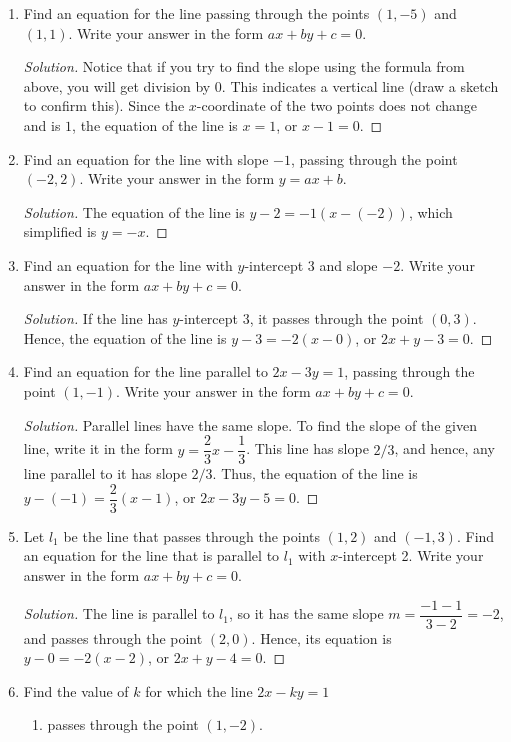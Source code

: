 \documentclass[12pt]{article}
\newenvironment{solution}{\begin{proof}[Solution]}{\end{proof}}
\begin{document}
\begin{enumerate}
		\begin{solution}
			The equation of a nonvertical line passing through two points $(x_1,y_1)$ and $(x_2,y_2)$ is $y-y_1=m(x-x_1)$, where the slope $m=\dfrac{y_2-y_1}{x_2-x_1}$. Note that it does not matter which point is first and which is second - they form the same line. For the given line, the slope is $m=\dfrac{2-0}{1-(-1)}=1$, so the equation of the line is $y-2=1(x-1)$, or $y=x+1$.
		\end{solution}
		\item Find an equation for the line passing through the points $(1,-5)$ and $(1,1)$. Write your answer in the form $ax+by+c=0$.
		\begin{solution}
			Notice that if you try to find the slope using the formula from above, you will get division by $0$. This indicates a vertical line (draw a sketch to confirm this). Since the $x$-coordinate of the two points does not change and is $1$, the equation of the line is $x=1$, or $x-1=0$.
		\end{solution}
		\item Find an equation for the line with slope $-1$, passing through the point $(-2,2)$. Write your answer in the form $y=ax+b$.
		\begin{solution}
			The equation of the line is $y-2=-1(x-(-2))$, which simplified is $y=-x$.
		\end{solution}
		\item Find an equation for the line with $y$-intercept 3 and slope $-2$. Write your answer in the form $ax+by+c=0$.
		\begin{solution}
			If the line has $y$-intercept $3$, it passes through the point $(0,3)$. Hence, the equation of the line is $y-3=-2(x-0)$, or $2x+y-3=0$.
		\end{solution}
		\item Find an equation for the line parallel to $2x-3y=1$, passing through the point $(1,-1)$. Write your answer in the form $ax+by+c=0$.
		\begin{solution}
			Parallel lines have the same slope. To find the slope of the given line, write it in the form $y=\dfrac{2}{3}x-\dfrac{1}{3}$. This line has slope $2/3$, and hence, any line parallel to it has slope $2/3$. Thus, the equation of the line is $y-(-1)=\dfrac{2}{3}(x-1)$, or $2x-3y-5=0$.
		\end{solution}
		\item Let $l_1$ be the line that passes through the points $(1,2)$ and $(-1,3)$. Find an equation for the line that is parallel to $l_1$ with $x$-intercept 2. Write your answer in the form $ax+by+c=0$.
		\begin{solution}
			The line is parallel to $l_1$, so it has the same slope $m=\dfrac{-1-1}{3-2}=-2$, and passes through the point $(2,0)$. Hence, its equation is $y-0=-2(x-2)$, or $2x+y-4=0$.
		\end{solution}
		\item Find the value of $k$ for which the line $2x-ky=1$
		\begin{enumerate}
			\item passes through the point $(1,-2)$.
			

\end{enumerate}
\end{enumerate}
\end{document}
